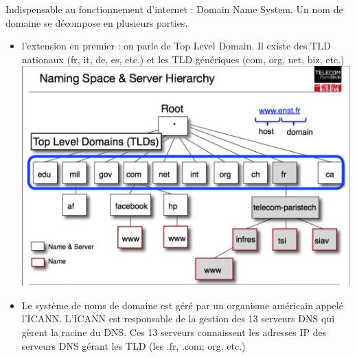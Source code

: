 \documentclass[a4paper,9pt, twocolumn]{article}
\begin{document}
	Indispensable au fonctionnement d'internet : Domain Name System. Un nom de domaine se décompose en plusieurs parties.
	\begin{itemize}
		\item l'extension en premier : on parle de Top Level Domain.
			Il existe des TLD nationaux (fr, it, de, es, etc.) et les TLD génériques (com, org, net, biz, etc.)
			\includegraphics[scale=0.45]{dns.png}
		\item Le système de noms de domaine est géré par un organisme américain appelé l'ICANN.
			L'ICANN est responsable de la gestion des 13 serveurs DNS qui gèrent la racine du DNS.
			Ces 13 serveurs connaissent les adresses IP des serveurs DNS gérant les TLD (les .fr, .com; org, etc.)
	\end{itemize}
\end{document}
